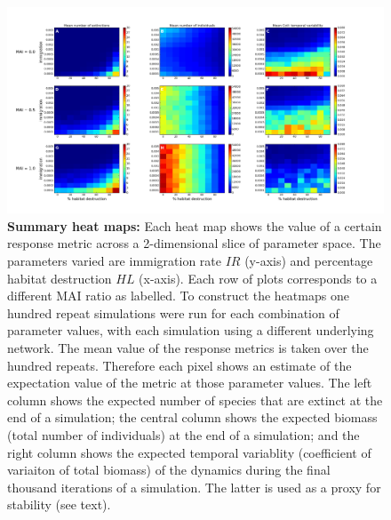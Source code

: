\clearpage
\thispagestyle{empty}
\begin{figure}

		\centering      
		\hspace{-3cm}

        \includegraphics[width=\linewidth]{"./chapters/chapter04/figures/sum_maps"}
        \caption{\textbf{Summary heat maps:} Each heat map shows the value of a certain response metric across a 2-dimensional slice of parameter space. The parameters varied are immigration rate $IR$ (y-axis) and percentage habitat destruction $HL$ (x-axis). Each row of plots corresponds to a different MAI ratio as labelled. To construct the heatmaps one hundred repeat simulations were run for each combination of parameter values, with each simulation using a different underlying network. The mean value of the response metrics is taken over the hundred repeats. Therefore each pixel shows an estimate of the expectation value of the metric at those parameter values. The left column shows the expected number of species that are extinct at the end of a simulation; the central column shows the expected biomass (total number of individuals) at the end of a simulation; and the right column shows the expected temporal variablity (coefficient of variaiton of total biomass) of the dynamics during the final thousand iterations of a simulation. The latter is used as a proxy for stability (see text).}\label{fig:summary_heatmaps_imvshl}
\end{figure}
\clearpage

